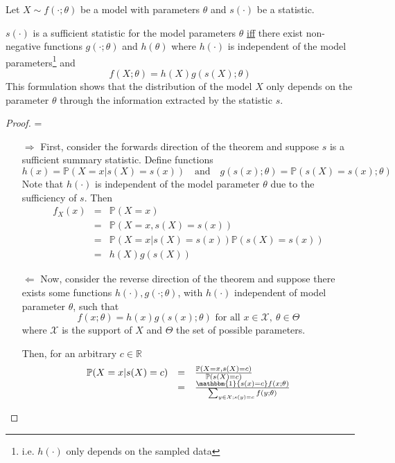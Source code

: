 \documentclass[11pt,a4paper,margin=0]{article}
\newcommand*{\indexed}{\mathbbm{1}}
\newcommand*{\prob}{\mathbb{P}}
\theoremstyle{break}
\begin{document}
  \begin{box_theorem}
    \par\par Let $X\sim f(\cdot;\theta)$ be a model with parameters $\theta$ and $s(\cdot)$ be a statistic.
    \par $s(\cdot)$ is a sufficient statistic for the model parameters $\theta$ \underline{iff} there exist non-negative functions $g(\cdot;\theta)$ and $h(\theta)$ where $h(\cdot)$ is independent of the model parameters\footnote{i.e. $h(\cdot)$ only depends on the sampled data} and
    \[ f(X;\theta)=h(X)g(s(X);\theta) \]
    This formulation shows that the distribution of the model $X$ only depends on the parameter $\theta$ through the information extracted by the statistic $s$.
    \begin{proof} \cite{fisher_neyman_factorisation_theorem_proof}
      \everymath={\displaystyle}
      \begin{itemize}
        \item[$\Longrightarrow$] First, consider the forwards direction of the theorem and suppose $s$ is a sufficient summary statistic. Define functions
        \[ h(x)=\prob(X=x|s(X)=s(x))\quad\text{and}\quad g(s(x);\theta)=\prob(s(X)=s(x);\theta)\]
        Note that $h(\cdot)$ is independent of the model parameter $\theta$ due to the sufficiency of $s$. Then
        \[\begin{array}{rcl}
          f_X(x)&=&\prob(X=x)\\
          &=&\prob(X=x,s(X)=s(x))\\
          &=&\prob(X=x|s(X)=s(x))\prob(s(X)=s(x))\\
          &=&h(X)g(s(X))
        \end{array}\]
        \item[$\Longleftarrow$] Now, consider the reverse direction of the theorem and suppose there exists some functions $h(\cdot),g(\cdot;\theta)$, with $h(\cdot)$ independent of model parameter $\theta$, such that
        \[ f(x;\theta)=h(x)g(s(x);\theta)\text{ for all }x\in\mathcal{X},\ \theta\in\Theta \]
        where $\mathcal{X}$ is the support of $X$ and $\Theta$ the set of possible parameters.
        \par Then, for an arbitrary $c\in\mathbb{R}$
        \[\begin{array}{rcl}
          \prob(X=x|s(X)=c)&=&\frac{\prob(X=x,s(X)=c)}{\prob(s(X)=c)}\\
          &=&\frac{\indexed\{s(x)=c\}f(x;\theta)}{\sum_{y\in\mathcal{X};s(y)=c}f(y;\theta)}\\

\end{array}\]
\end{itemize}
\end{proof}
\end{box_theorem}
\end{document}
